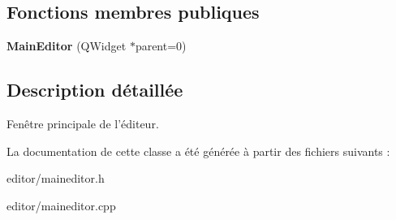 \subsection*{Fonctions membres publiques}
\begin{DoxyCompactItemize}
\item 
\hypertarget{classMainEditor_a58a308ba8043e53ea5525e87540b0a71}{{\bfseries Main\+Editor} (Q\+Widget $\ast$parent=0)}\label{classMainEditor_a58a308ba8043e53ea5525e87540b0a71}

\end{DoxyCompactItemize}


\subsection{Description détaillée}
Fenêtre principale de l’éditeur. 

La documentation de cette classe a été générée à partir des fichiers suivants \+:\begin{DoxyCompactItemize}
\item 
editor/maineditor.\+h\item 
editor/maineditor.\+cpp\end{DoxyCompactItemize}
